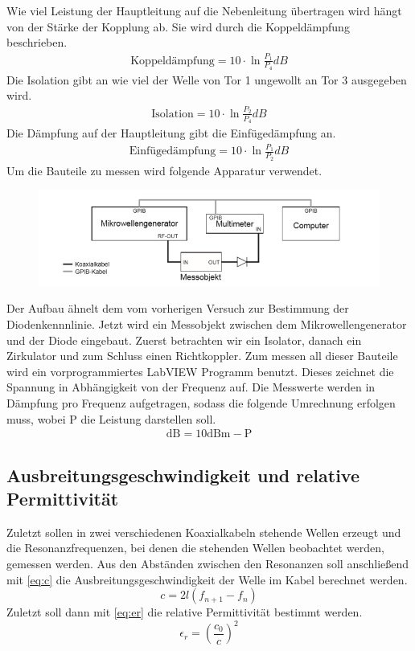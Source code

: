 Wie viel Leistung der Hauptleitung auf die Nebenleitung übertragen wird hängt von der Stärke der Kopplung ab. Sie wird durch die Koppeldämpfung beschrieben.
\begin{align}
\text{Koppeldämpfung} = 10\cdot \ln{\frac{P_1}{P_4}}dB
\label{KppF}
\end{align}
Die Isolation gibt an wie viel der Welle von Tor 1 ungewollt an Tor 3 ausgegeben wird.
\begin{align}
\text{Isolation} = 10\cdot \ln{\frac{P_2}{P_4}}dB
\label{IsoF}
\end{align}
Die Dämpfung auf der Hauptleitung gibt die Einfügedämpfung an. 
\begin{align}
\text{Einfügedämpfung} = 10\cdot \ln{\frac{P_1}{P_2}}dB
\label{EinF}
\end{align}
Um die Bauteile zu messen wird folgende Apparatur verwendet.
\begin{figure}[h!]
	\centering
	\includegraphics[scale = 1]{Mess.PNG}
	\caption{}
	\label{}
\end{figure}
Der Aufbau ähnelt dem vom vorherigen Versuch zur Bestimmung der Diodenkennnlinie. Jetzt wird ein Messobjekt zwischen dem Mikrowellengenerator und der Diode eingebaut. Zuerst betrachten wir ein Isolator, danach ein Zirkulator und zum Schluss einen Richtkoppler. Zum messen all dieser Bauteile wird ein vorprogrammiertes LabVIEW Programm benutzt. Dieses zeichnet die Spannung in Abhängigkeit von der Frequenz auf. Die Messwerte werden in Dämpfung pro Frequenz aufgetragen, sodass die folgende Umrechnung erfolgen muss, wobei P die Leistung darstellen soll.
\begin{align}
\text{dB} = 10\text{dBm} - \text{P}
\label{F1}
\end{align}

\subsection{Ausbreitungsgeschwindigkeit und relative Permittivität}
Zuletzt sollen in zwei verschiedenen Koaxialkabeln stehende Wellen erzeugt und die Resonanzfrequenzen, bei denen die stehenden Wellen beobachtet werden, gemessen werden. Aus den Abständen zwischen den Resonanzen soll anschließend mit \cref{eq:c} die Ausbreitungsgeschwindigkeit der Welle im Kabel berechnet werden.
\begin{equation}
c = 2l(f_{n+1} - f_n)
\label{eq:c}
\end{equation}
Zuletzt soll dann mit \cref{eq:er} die relative Permittivität bestimmt werden.
\begin{equation}
\epsilon_r = \left( \frac{c_0}{c}\right) ^2
\label{eq:er}
\end{equation}

